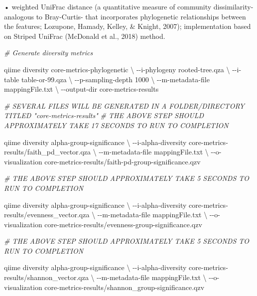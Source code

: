 \documentclass[
]{book}
\newenvironment{Shaded}{\begin{snugshade}}{\end{snugshade}}
\newcommand{\CommentTok}[1]{\textcolor[rgb]{0.56,0.35,0.01}{\textit{#1}}}
\newcommand{\DataTypeTok}[1]{\textcolor[rgb]{0.13,0.29,0.53}{#1}}
\newcommand{\ExtensionTok}[1]{#1}
\newcommand{\NormalTok}[1]{#1}
\begin{document}
• weighted UniFrac distance (a quantitative measure of community dissimilarity- analogous to Bray-Curtis- that incorporates phylogenetic relationships between the features; Lozupone, Hamady, Kelley, \& Knight, 2007); implementation based on Striped UniFrac (McDonald et al., 2018) method.

\begin{Shaded}
\begin{Highlighting}[]

\CommentTok{\# Generate diversity metrics}

\ExtensionTok{qiime}\NormalTok{ diversity core{-}metrics{-}phylogenetic }\DataTypeTok{\textbackslash{}}
\NormalTok{{-}{-}i{-}phylogeny rooted{-}tree.qza }\DataTypeTok{\textbackslash{}}
\NormalTok{{-}{-}i{-}table table{-}or{-}99.qza }\DataTypeTok{\textbackslash{}}
\NormalTok{{-}{-}p{-}sampling{-}depth 1000 }\DataTypeTok{\textbackslash{}}
\NormalTok{{-}{-}m{-}metadata{-}file mappingFile.txt }\DataTypeTok{\textbackslash{}}
\NormalTok{{-}{-}output{-}dir core{-}metrics{-}results}

\CommentTok{\# SEVERAL FILES WILL BE GENERATED IN A FOLDER/DIRECTORY TITLED "core{-}metrics{-}results"}
\CommentTok{\# THE ABOVE STEP SHOULD APPROXIMATELY TAKE 17 SECONDS TO RUN TO COMPLETION}

\ExtensionTok{qiime}\NormalTok{ diversity alpha{-}group{-}significance }\DataTypeTok{\textbackslash{}}
\NormalTok{{-}{-}i{-}alpha{-}diversity core{-}metrics{-}results/faith\_pd\_vector.qza }\DataTypeTok{\textbackslash{}}
\NormalTok{{-}{-}m{-}metadata{-}file mappingFile.txt }\DataTypeTok{\textbackslash{}}
\NormalTok{{-}{-}o{-}visualization core{-}metrics{-}results/faith{-}pd{-}group{-}significance.qzv}

\CommentTok{\# THE ABOVE STEP SHOULD APPROXIMATELY TAKE 5 SECONDS TO RUN TO COMPLETION}

\ExtensionTok{qiime}\NormalTok{ diversity alpha{-}group{-}significance }\DataTypeTok{\textbackslash{}}
\NormalTok{{-}{-}i{-}alpha{-}diversity core{-}metrics{-}results/evenness\_vector.qza }\DataTypeTok{\textbackslash{}}
\NormalTok{{-}{-}m{-}metadata{-}file mappingFile.txt }\DataTypeTok{\textbackslash{}}
\NormalTok{{-}{-}o{-}visualization core{-}metrics{-}results/evenness{-}group{-}significance.qzv}

\CommentTok{\# THE ABOVE STEP SHOULD APPROXIMATELY TAKE 5 SECONDS TO RUN TO COMPLETION}

\ExtensionTok{qiime}\NormalTok{ diversity alpha{-}group{-}significance  }\DataTypeTok{\textbackslash{}}
\NormalTok{{-}{-}i{-}alpha{-}diversity core{-}metrics{-}results/shannon\_vector.qza }\DataTypeTok{\textbackslash{}}
\NormalTok{{-}{-}m{-}metadata{-}file mappingFile.txt }\DataTypeTok{\textbackslash{}}
\NormalTok{{-}{-}o{-}visualization core{-}metrics{-}results/shannon\_group{-}significance.qzv}


\end{Highlighting}
\end{Shaded}
\end{document}
